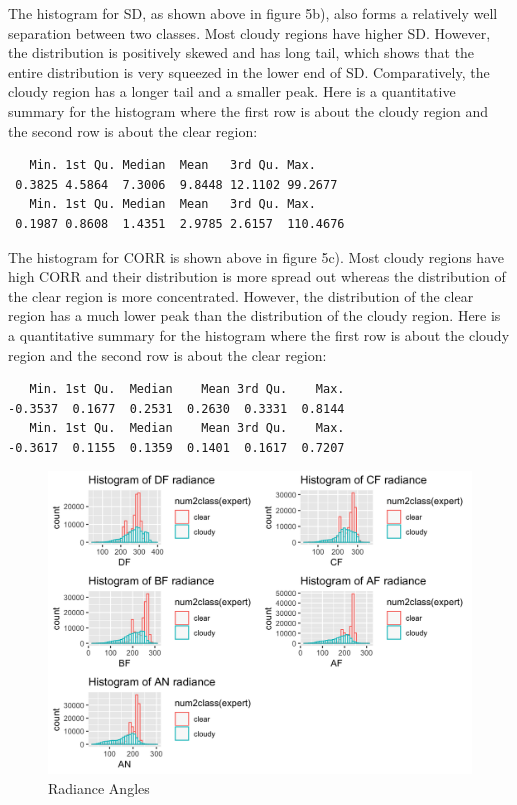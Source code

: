 \documentclass[jou]{apa}%
\begin{document}
The histogram for SD, as shown above in figure 5b), also forms a relatively well separation between two classes. Most cloudy regions have higher SD. However, the distribution is positively skewed and has long tail, which shows that the entire distribution is very squeezed in the lower end of SD. Comparatively, the cloudy region has a longer tail and a smaller peak. Here is a quantitative summary for the histogram where the first row is about the cloudy region and the second row is about the clear region:
\begin{verbatim}
   Min. 1st Qu. Median  Mean   3rd Qu. Max. 
 0.3825 4.5864  7.3006  9.8448 12.1102 99.2677 
   Min. 1st Qu. Median  Mean   3rd Qu. Max. 
 0.1987 0.8608  1.4351  2.9785 2.6157  110.4676 
\end{verbatim}
The histogram for CORR is shown above in figure 5c). Most cloudy regions have high CORR and their distribution is more spread out whereas the distribution of the clear region is more concentrated. However, the distribution of the clear region has a much lower peak than the distribution of the cloudy region. Here is a quantitative summary for the histogram where the first row is about the cloudy region and the second row is about the clear region:
\begin{verbatim}
   Min. 1st Qu.  Median    Mean 3rd Qu.    Max. 
-0.3537  0.1677  0.2531  0.2630  0.3331  0.8144 
   Min. 1st Qu.  Median    Mean 3rd Qu.    Max. 
-0.3617  0.1155  0.1359  0.1401  0.1617  0.7207 
\end{verbatim}
\vspace*{-0.1cm}\begin{figure}[H]\hspace*{-0.5cm} \centering\includegraphics[scale=0.17,]{radiance}\caption{Radiance Angles}\end{figure}
\end{document}
